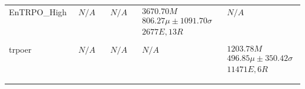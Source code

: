 \begin{tabular}{|l|p{3.2cm}|p{3.2cm}|p{3.2cm}|p{3.2cm}|}
EnTRPO_High & $\begin{array}{c} N/A \end{array}$ & $\begin{array}{c} N/A \end{array}$ & $\begin{array}{c} 3670.70M \\ 806.27\mu \pm 1091.70\sigma \\ 2677E, 13R \end{array}$ & $\begin{array}{c} N/A \end{array}$ \\ \\ \hline
trpoer & $\begin{array}{c} N/A \end{array}$ & $\begin{array}{c} N/A \end{array}$ & $\begin{array}{c} N/A \end{array}$ & $\begin{array}{c} 1203.78M \\ 496.85\mu \pm 350.42\sigma \\ 11471E, 6R \end{array}$ \\ \\ \hline
\bottomrule \\ \hline
\end{tabular}
